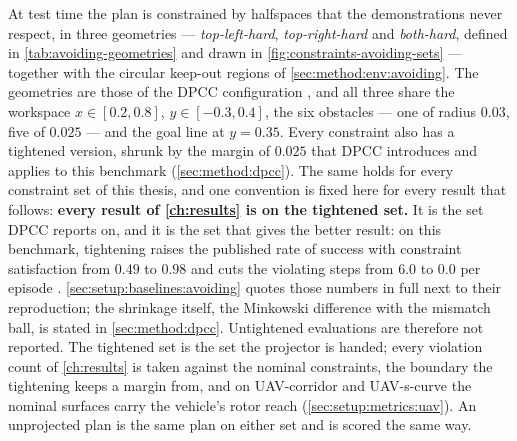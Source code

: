 At test time
the plan is constrained by halfspaces that the demonstrations never respect, in three geometries --- \emph{top-left-hard}, \emph{top-right-hard} and \emph{both-hard}, defined in \autoref{tab:avoiding-geometries} and drawn in \autoref{fig:constraints-avoiding-sets} --- together with the circular keep-out regions
of \autoref{sec:method:env:avoiding}. The geometries are those of the \ac{DPCC} configuration \parencite[Sec.~6.1]{romer2025diffusion}, and all three share the workspace $x\in[0.2,0.8]$, $y\in[-0.3,0.4]$, the six obstacles --- one of radius $0.03$, five of $0.025$ --- and the goal line at $y=0.35$. Every
constraint also has a tightened version, shrunk by the margin of $0.025$ that \ac{DPCC} introduces and
applies to this benchmark \parencite[Sec.~5.3]{romer2025diffusion} (\autoref{sec:method:dpcc}). The same
holds for every constraint set of this thesis, and one convention is fixed here for every result that
follows: \textbf{every result of \autoref{ch:results} is on the tightened set.} It is the set \ac{DPCC}
reports on, and it is the set that gives the better result: on this benchmark, tightening raises the
published rate of success with constraint satisfaction from $0.49$ to $0.98$ and cuts the violating steps
from $6.0$ to $0.0$ per episode \parencite[Table~1]{romer2025diffusion}. \autoref{sec:setup:baselines:avoiding}
quotes those numbers in full next to their reproduction; the shrinkage itself, the Minkowski difference
with the mismatch ball, is stated in \autoref{sec:method:dpcc}. Untightened evaluations are therefore not
reported. The tightened set is the set the projector is handed; every violation count of
\autoref{ch:results} is taken against the nominal constraints, the boundary the tightening keeps a margin
from, and on UAV-corridor and UAV-s-curve the nominal surfaces carry the vehicle's rotor reach
(\autoref{sec:setup:metrics:uav}). An unprojected plan is the same plan on either set and is scored the
same way.

